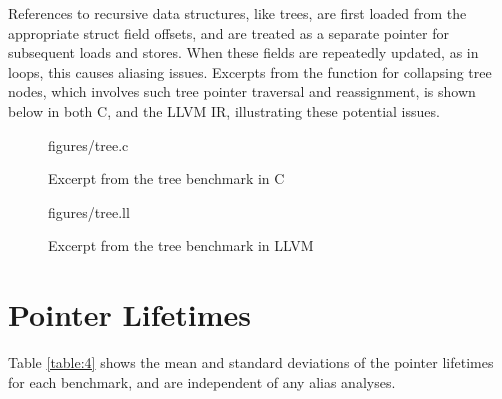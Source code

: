 References to recursive data structures, like trees, are first loaded from the appropriate struct field offsets, and are treated as a separate pointer for subsequent loads and stores. When these fields are repeatedly updated, as in loops, this causes aliasing issues. Excerpts from the function for collapsing tree nodes, which involves such tree pointer traversal and reassignment, is shown below in both C, and the LLVM IR, illustrating these potential issues.

\begin{figure} [h!]
   {figures/tree.c}
  \caption{Excerpt from the tree benchmark in C}
  \label{fig:treec}
\end{figure}

\begin{figure} [h!]
   {figures/tree.ll}
  \caption{Excerpt from the tree benchmark in LLVM}
  \label{fig:treell}
\end{figure}

\section{Pointer Lifetimes}
Table \ref{table:4} shows the mean and standard deviations of the pointer lifetimes for each benchmark, and are independent of any alias analyses.

